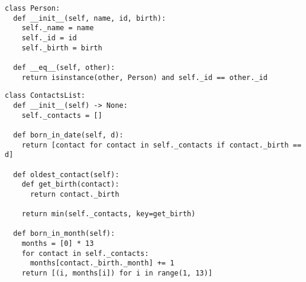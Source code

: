 \documentclass[11pt]{article}
\begin{document}
\begin{lstlisting}
class Person:
  def __init__(self, name, id, birth):
    self._name = name
    self._id = id
    self._birth = birth

  def __eq__(self, other):
    return isinstance(other, Person) and self._id == other._id
\end{lstlisting}

\begin{lstlisting}
class ContactsList:
  def __init__(self) -> None:
    self._contacts = []

  def born_in_date(self, d):
    return [contact for contact in self._contacts if contact._birth == d]

  def oldest_contact(self):
    def get_birth(contact):
      return contact._birth

    return min(self._contacts, key=get_birth)

  def born_in_month(self):
    months = [0] * 13
    for contact in self._contacts:
      months[contact._birth._month] += 1
    return [(i, months[i]) for i in range(1, 13)]
\end{lstlisting}
\end{document}
